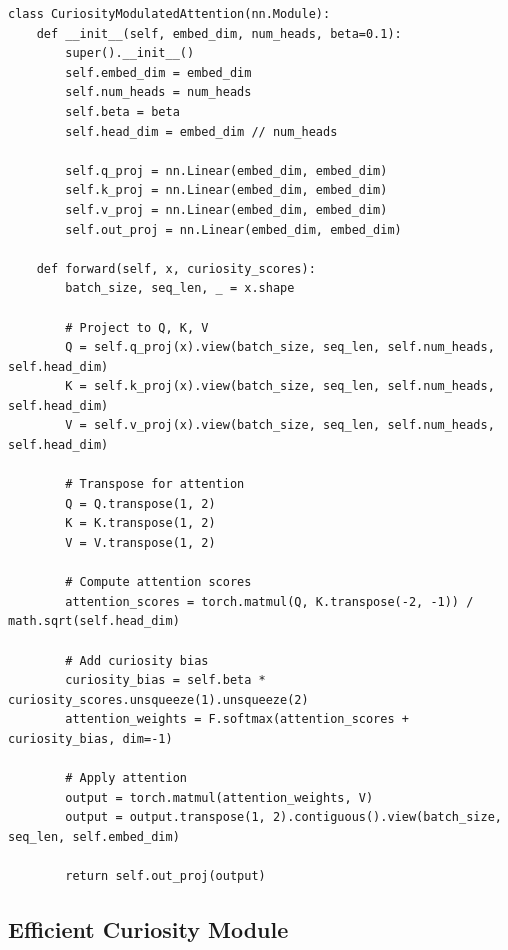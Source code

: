 \documentclass{IEEEtran}
\begin{document}
\begin{verbatim}
class CuriosityModulatedAttention(nn.Module):
    def __init__(self, embed_dim, num_heads, beta=0.1):
        super().__init__()
        self.embed_dim = embed_dim
        self.num_heads = num_heads
        self.beta = beta
        self.head_dim = embed_dim // num_heads
        
        self.q_proj = nn.Linear(embed_dim, embed_dim)
        self.k_proj = nn.Linear(embed_dim, embed_dim)
        self.v_proj = nn.Linear(embed_dim, embed_dim)
        self.out_proj = nn.Linear(embed_dim, embed_dim)
    
    def forward(self, x, curiosity_scores):
        batch_size, seq_len, _ = x.shape
        
        # Project to Q, K, V
        Q = self.q_proj(x).view(batch_size, seq_len, self.num_heads, self.head_dim)
        K = self.k_proj(x).view(batch_size, seq_len, self.num_heads, self.head_dim)
        V = self.v_proj(x).view(batch_size, seq_len, self.num_heads, self.head_dim)
        
        # Transpose for attention
        Q = Q.transpose(1, 2)
        K = K.transpose(1, 2)
        V = V.transpose(1, 2)
        
        # Compute attention scores
        attention_scores = torch.matmul(Q, K.transpose(-2, -1)) / math.sqrt(self.head_dim)
        
        # Add curiosity bias
        curiosity_bias = self.beta * curiosity_scores.unsqueeze(1).unsqueeze(2)
        attention_weights = F.softmax(attention_scores + curiosity_bias, dim=-1)
        
        # Apply attention
        output = torch.matmul(attention_weights, V)
        output = output.transpose(1, 2).contiguous().view(batch_size, seq_len, self.embed_dim)
        
        return self.out_proj(output)
\end{verbatim}

\subsection{Efficient Curiosity Module}
\end{document}
